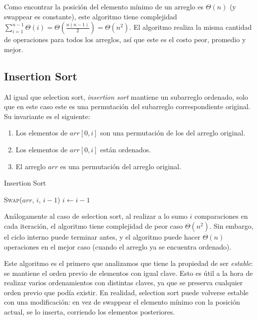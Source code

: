 \documentclass{article}
\newcommand{\BigTheta}[1]{{\Theta(#1)}}
\begin{document}
Como encontrar la posición del elemento mínimo de un arreglo es $\BigTheta{n}$ (y swappear es constante), este algoritmo tiene complejidad $\sum_{i=1}^{n-1} \BigTheta{i} = \BigTheta{\frac{n(n-1)}{2}} = \BigTheta{n^2}$. El algoritmo realiza la misma cantidad de operaciones para todos los arreglos, así que este es el costo peor, promedio y mejor.

\subsection{Insertion Sort}

Al igual que selection sort, \textit{insertion sort} mantiene un subarreglo ordenado, solo que en este caso este es una permutación del subarreglo correspondiente original. Su invariante es el siguiente:
\begin{enumerate}
    \item Los elementos de $arr[0, i]$ son una permutación de los del arreglo original.
    \item Los elementos de $arr[0, i]$ están ordenados.
    \item El arreglo $arr$ es una permutación del arreglo original.
\end{enumerate}

\begin{algorithm}[H]
    \caption*{Insertion Sort}
    \begin{algorithmic}
        \State \textsc{Swap}($arr$, $i$, $i-1$)
        \State $i \gets i - 1$
        \EndWhile
        \EndFor
    \end{algorithmic}
\end{algorithm}

Análogamente al caso de selection sort, al realizar a lo sumo $i$ comparaciones en cada iteración, el algoritmo tiene complejidad de peor caso $\BigTheta{n^2}$. Sin embargo, el ciclo interno puede terminar antes, y el algoritmo puede hacer $\BigTheta{n}$ operaciones en el mejor caso (cuando el arreglo ya se encuentra ordenado).

Este algoritmo es el primero que analizamos que tiene la propiedad de ser \textit{estable}: se mantiene el orden previo de elementos con igual clave. Esto es útil a la hora de realizar varios ordenamientos con distintas claves, ya que se preserva cualquier orden previo que podía existir. En realidad, selection sort puede volverse estable con una modificación: en vez de swappear el elemento mínimo con la posición actual, se lo inserta, corriendo los elementos posteriores.
\end{document}
